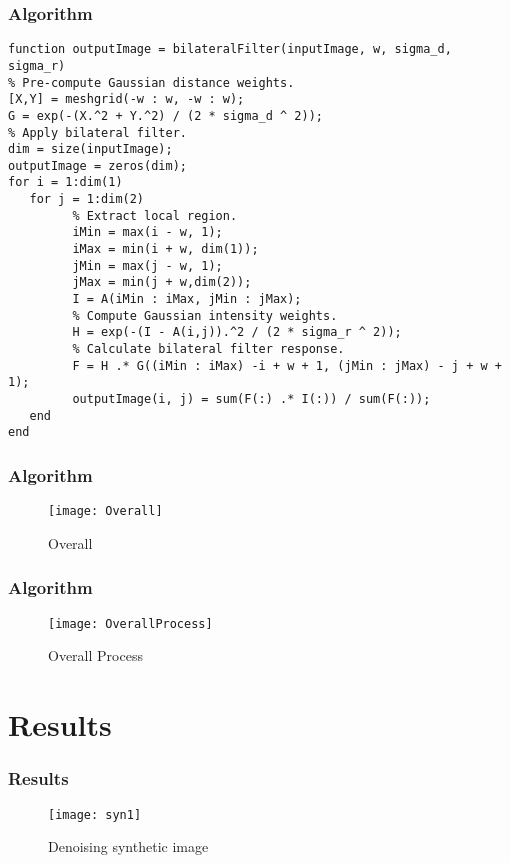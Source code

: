 \documentclass{beamer}
\begin{document}
\begin{frame}[fragile]
\frametitle{Algorithm}

\fontsize{7pt}{9pt}\selectfont
%
\begin{verbatim}
function outputImage = bilateralFilter(inputImage, w, sigma_d, sigma_r)
% Pre-compute Gaussian distance weights.
[X,Y] = meshgrid(-w : w, -w : w);
G = exp(-(X.^2 + Y.^2) / (2 * sigma_d ^ 2));
% Apply bilateral filter.
dim = size(inputImage);
outputImage = zeros(dim);
for i = 1:dim(1)
   for j = 1:dim(2)
         % Extract local region.
         iMin = max(i - w, 1);
         iMax = min(i + w, dim(1));
         jMin = max(j - w, 1);
         jMax = min(j + w,dim(2));
         I = A(iMin : iMax, jMin : jMax);
         % Compute Gaussian intensity weights.
         H = exp(-(I - A(i,j)).^2 / (2 * sigma_r ^ 2));
         % Calculate bilateral filter response.
         F = H .* G((iMin : iMax) -i + w + 1, (jMin : jMax) - j + w + 1);
         outputImage(i, j) = sum(F(:) .* I(:)) / sum(F(:));
   end
end
\end{verbatim}

\end{frame}

\begin{frame}
\frametitle{Algorithm}
\begin{figure}
\texttt{[image: Overall]}
\caption{Overall}
\end{figure}
\end{frame}

\begin{frame}
\frametitle{Algorithm}
\begin{figure}
\texttt{[image: OverallProcess]}
\caption{Overall Process}
\end{figure}
\end{frame}

\section{Results}

\begin{frame}
\frametitle{Results}
\begin{figure}
\texttt{[image: syn1]}
\caption{Denoising synthetic image}
\end{figure}
\end{frame}
\end{document}
